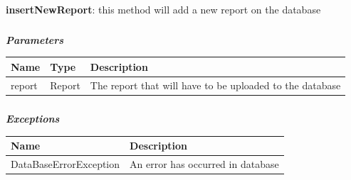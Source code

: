 						\paragraph{}
							\textbf{insertNewReport}: this method will add a new report on the database
							\subparagraph{}
							\textit{\textbf{Parameters}}
								\begin{table}[!h]
									\begin{tabular}{L{0.2\textwidth}L{0.2\textwidth}L{0.2\textwidth}}
										\toprule
										Name & Type & Description \\
										\midrule
								  		report & Report & The report that will have to be uploaded to the database \\
								 		\bottomrule
									\end{tabular}
								\end{table}
							\subparagraph{}
							\textit{\textbf{Exceptions}}
								\begin{table}[!h]
									\begin{tabular}{L{0.3\textwidth}L{0.3\textwidth}}
										\toprule
										Name & Description \\
										\midrule
								  		DataBaseErrorException & An error has occurred in database \\
								 		\bottomrule
									\end{tabular}
								\end{table}
